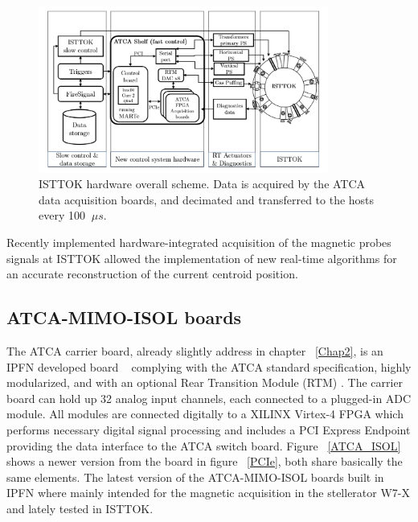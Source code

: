 \begin{figure}[htbp]
	\centering
	\includegraphics[width=0.85\textwidth]{Chp4/control_schem_1.PNG}
	\caption{\label{ISTTOK_hard} ISTTOK hardware overall scheme. Data is acquired by the
		ATCA data acquisition boards, and decimated and transferred to the hosts
		every 100 $~\mu s$. }
\end{figure}


Recently implemented hardware-integrated acquisition of the magnetic probes signals at ISTTOK allowed the implementation of new real-time algorithms for an accurate reconstruction of the current centroid position. \smallskip

\subsection{ATCA-MIMO-ISOL boards}

The ATCA carrier board, already slightly address in chapter ~\ref{Chap2}, is an IPFN developed board ~\cite{Batista2010} complying with the ATCA standard specification, highly modularized, and with an optional Rear Transition Module (RTM) . The carrier board can hold up 32 analog input channels, each connected to a plugged-in ADC module. All modules are connected digitally to a XILINX Virtex-4 FPGA which performs necessary digital signal processing and includes a PCI Express Endpoint providing the data interface to the ATCA switch board. Figure ~\ref{ATCA_ISOL} shows a newer version   from the board in figure ~\ref{PCIe}, both share basically the same elements. The latest version of the ATCA-MIMO-ISOL boards built in IPFN where mainly intended for the magnetic acquisition in the stellerator W7-X and lately tested in ISTTOK.  
\smallskip




